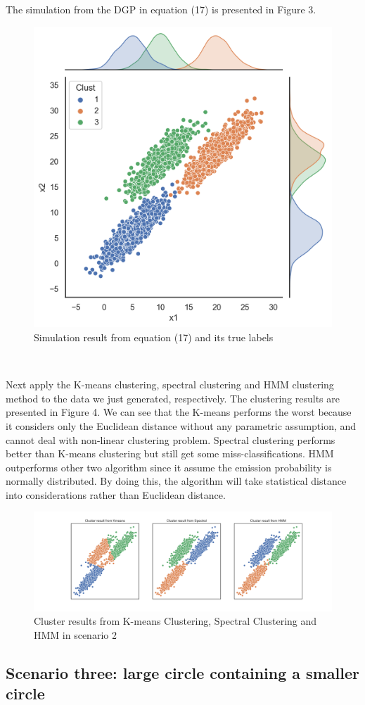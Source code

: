 \documentclass[a4paper]{article}
\begin{document}
The simulation from the DGP in equation (17) is presented in Figure 3. 

\begin{figure}[h!]
  \centering
  \includegraphics[width=0.45\linewidth]{../Simu_results/sen2.png}
  \caption{Simulation result from equation (17) and its true labels}
  \label{fig:sec}
\end{figure}

\



Next apply the K-means clustering, spectral clustering and HMM clustering method to the data we just generated, respectively. The clustering results are presented in Figure 4. We can see that the K-means performs the worst because it considers only the Euclidean distance without any parametric assumption, and cannot deal with non-linear clustering problem. Spectral clustering performs better than K-means clustering but still get some miss-classifications. HMM outperforms other two algorithm since it assume the emission probability is normally distributed. By doing this, the algorithm will take statistical distance into considerations rather than Euclidean distance.

\begin{figure}[h!]
  \centering
  \includegraphics[width=0.8\linewidth]{../Simu_results/sen2_clust.png}
  \caption{Cluster results from K-means Clustering, Spectral Clustering and HMM in scenario 2}
\end{figure}

\subsection{Scenario three:  large circle containing a smaller circle}
\end{document}
